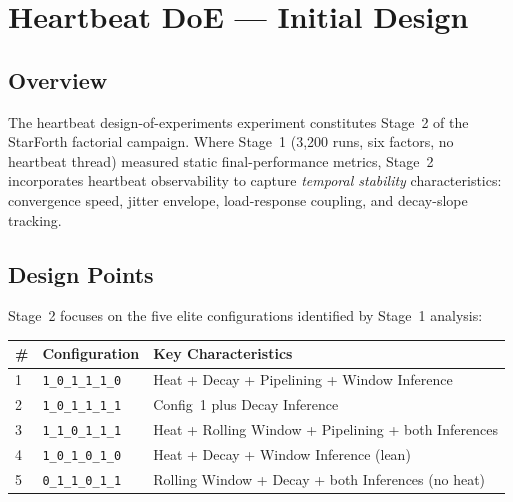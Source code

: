 
\section{Heartbeat DoE — Initial Design}
\label{sec:heartbeat-doe-design}

\subsection{Overview}

The heartbeat design-of-experiments experiment constitutes Stage~2 of the
StarForth factorial campaign. Where Stage~1 (3{,}200 runs, six factors, no
heartbeat thread) measured static final-performance metrics, Stage~2
incorporates heartbeat observability to capture \emph{temporal stability}
characteristics: convergence speed, jitter envelope, load-response coupling,
and decay-slope tracking.

\subsection{Design Points}

Stage~2 focuses on the five elite configurations identified by Stage~1
analysis:

\begin{center}
\begin{tabular}{llp{6cm}}
\toprule
\# & Configuration & Key Characteristics \\
\midrule
1 & \texttt{1\_0\_1\_1\_1\_0} & Heat + Decay + Pipelining + Window Inference \\
2 & \texttt{1\_0\_1\_1\_1\_1} & Config~1 plus Decay Inference \\
3 & \texttt{1\_1\_0\_1\_1\_1} & Heat + Rolling Window + Pipelining + both Inferences \\
4 & \texttt{1\_0\_1\_0\_1\_0} & Heat + Decay + Window Inference (lean) \\
5 & \texttt{0\_1\_1\_0\_1\_1} & Rolling Window + Decay + both Inferences (no heat) \\
\bottomrule
\end{tabular}
\end{center}

